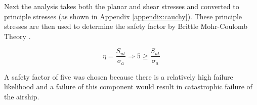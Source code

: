 \documentclass[../main.tex]{subfiles}
\begin{document}
Next the analysis takes both the planar and shear stresses and converted to principle stresses (as shown in Appendix \ref{appendix:cauchy}). These principle stresses are then used to determine the safety factor by Brittle Mohr-Coulomb Theory \cite[227]{shigley}.

\begin{equation}
\eta = \dfrac{S_{ut}}{\sigma _a} \Rightarrow 5 \geq \dfrac{S_{ut}}{\sigma _a}
\end{equation}

A safety factor of five was chosen because there is a relatively high failure likelihood and a failure of this component would result in catastrophic failure of the airship.
\end{document}

